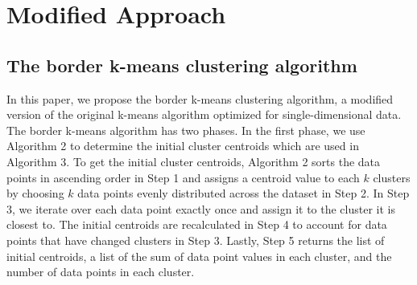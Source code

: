 \documentclass[conference,compsoc]{IEEEtran}
\begin{document}
\section{Modified Approach}

\subsection{The border k-means clustering algorithm}

In this paper, we propose the border k-means clustering algorithm, a modified version of the original k-means algorithm optimized for single-dimensional data. The border k-means algorithm has two phases. In the first phase, we use Algorithm 2 to determine the initial cluster centroids which are used in Algorithm 3. To get the initial cluster centroids, Algorithm 2 sorts the data points in ascending order in Step 1 and assigns a centroid value to each $k$ clusters by choosing $k$ data points evenly distributed across the dataset in Step 2. In Step 3, we iterate over each data point exactly once and assign it to the cluster it is closest to. The initial centroids are recalculated in Step 4 to account for data points that have changed clusters in Step 3. Lastly, Step 5 returns the list of initial centroids, a list of the sum of data point values in each cluster, and the number of data points in each cluster.
\end{document}
